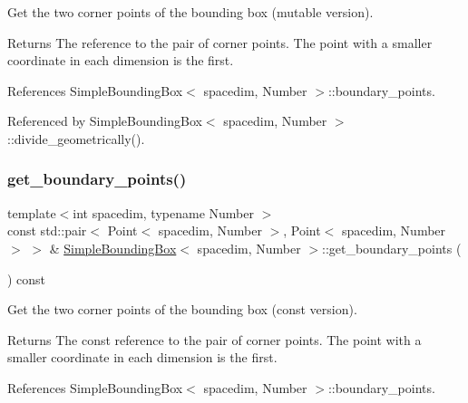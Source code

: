 Get the two corner points of the bounding box (mutable version). \begin{DoxyReturn}{Returns}
The reference to the pair of corner points. The point with a smaller coordinate in each dimension is the first. 
\end{DoxyReturn}


References Simple\+Bounding\+Box$<$ spacedim, Number $>$\+::boundary\+\_\+points.



Referenced by Simple\+Bounding\+Box$<$ spacedim, Number $>$\+::divide\+\_\+geometrically().

\mbox{\label{classSimpleBoundingBox_a7c1af5d42bfc12cd3d0c955863fe0d75}} 
\subsubsection{\texorpdfstring{get\+\_\+boundary\+\_\+points()}{get\_boundary\_points()}\hspace{0.1cm}{\footnotesize\ttfamily [2/2]}}
{\footnotesize\ttfamily template$<$int spacedim, typename Number $>$ \\
const std\+::pair$<$ Point$<$ spacedim, Number $>$, Point$<$ spacedim, Number $>$ $>$ \& \hyperlink{classSimpleBoundingBox}{Simple\+Bounding\+Box}$<$ spacedim, Number $>$\+::get\+\_\+boundary\+\_\+points (\begin{DoxyParamCaption}{ }\end{DoxyParamCaption}) const}

Get the two corner points of the bounding box (const version). \begin{DoxyReturn}{Returns}
The const reference to the pair of corner points. The point with a smaller coordinate in each dimension is the first. 
\end{DoxyReturn}


References Simple\+Bounding\+Box$<$ spacedim, Number $>$\+::boundary\+\_\+points.

\mbox{\label{classSimpleBoundingBox_af58f37fb60a09a61730797850886c39f}} 
